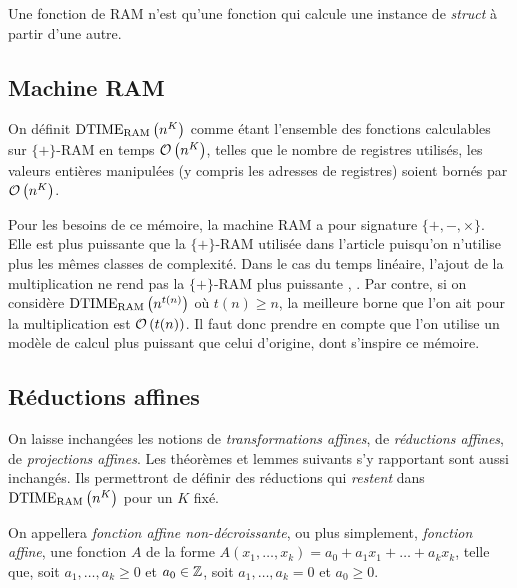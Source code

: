 		Une fonction de RAM n'est qu'une fonction qui calcule une instance de \emph{struct} à partir d'une autre. 
		
		
		
		\subsection{Machine RAM} %
		\label{subsec:machine_RAM}
		
		\begin{definition}
			\label{def:temps_poly_RAM}
			On définit $\text{DTIME}_{\text{RAM}}\left( n^K \right)$ comme étant l'ensemble des fonctions calculables sur $\{+\}$-RAM en temps $\mathcal{O}\left( n^K \right)$, telles que le nombre de registres utilisés, les valeurs entières manipulées (y compris les adresses de registres) soient bornés par $\mathcal{O}\left( n^K \right)$.
		\end{definition}
		
		Pour les besoins de ce mémoire, la machine RAM a pour signature $\{+ , -, \times \}$. Elle est plus puissante que la $\{+\}$-RAM utilisée dans l'article \cite{Grandjean1994} puisqu'on n'utilise plus les mêmes classes de complexité. Dans le cas du temps linéaire, l'ajout de la multiplication ne rend pas la $\{+\}$-RAM plus puissante \cite{Grandjean1994}, \cite{GrandjeanSchwentick2002}. Par contre, si on considère $\text{DTIME}_{\text{RAM}}\left( n^{t(n)} \right)$ où $t(n) \geqslant n$, la meilleure borne que l'on ait pour la multiplication est $\mathcal{O}\left( t(n) \right)$. Il faut donc prendre en compte que l'on utilise un modèle de calcul plus puissant que celui d'origine, dont s'inspire ce mémoire.
		
		
		\subsection{Réductions affines} %
		\label{subsec:reductions_affines}
		
		On laisse inchangées les notions de \emph{transformations affines}, de \emph{réductions affines}, de \emph{projections affines}. Les théorèmes et lemmes suivants s'y rapportant sont aussi inchangés. Ils permettront de définir des réductions qui \emph{restent} dans $\text{DTIME}_{\text{RAM}}\left( n^K \right)$ pour un $K$ fixé. 
		
		\begin{definition}
			On appellera \emph{fonction affine non-décroissante}, ou plus simplement, \emph{fonction affine}, une fonction $A$ de la forme $A(x_1, \dots, x_k) = a_0 + a_1 x_1 + \dots + a_k x_k$, telle que, soit $a_1, \dots, a_k \geqslant 0$ et $a_0 \in \mathbb{Z}$, soit $a_1, \dots, a_k = 0$ et $a_0 \geqslant 0$.
		\end{definition}
		
